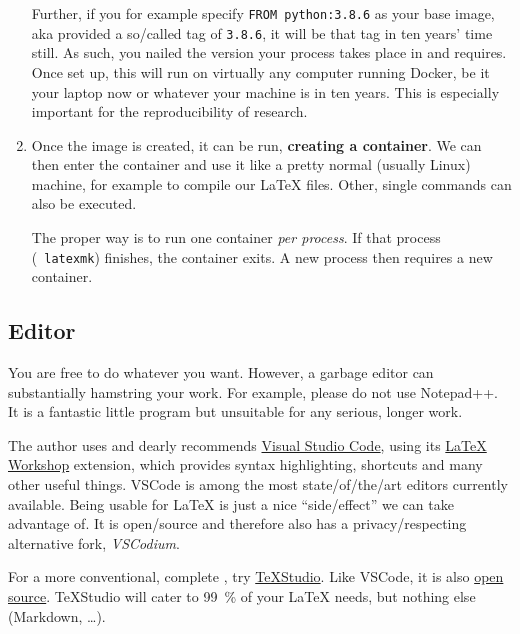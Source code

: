 \begin{enumerate}
        Further, if you for example specify \texttt{FROM python:3.8.6}
        as your base image, aka provided a so\-/called tag of \texttt{3.8.6}, it will be that tag in ten years' time still.
        As such, you nailed the version your process takes place in and requires.
        Once set up, this will run on virtually any computer running Docker, be it your
        laptop now or whatever your machine is in ten years.
        This is especially important for the reproducibility of research.
    \item Once the image is created, it can be run, \textbf{creating a container}.
        We can then enter the container and use it like a pretty normal (usually Linux)
        machine, for example to compile our \LaTeX{} files.
        Other, single commands can also be executed.

        The proper way is to run one container \emph{per process}.
        If that process (\ \texttt{latexmk}) finishes, the container exits.
        A new process then requires a new container.
\end{enumerate}

\subsection{Editor}
\label{ch:editor}

You are free to do whatever you want.
However, a garbage editor can substantially hamstring your work.
For example, please do not use Notepad++.
It is a fantastic little program but unsuitable for any serious, longer work.

The author uses and dearly recommends \href{https://code.visualstudio.com/}{Visual Studio Code},
using its
\href{https://marketplace.visualstudio.com/items?itemName=James-Yu.latex-workshop}{\LaTeX{} Workshop} extension, which provides syntax highlighting, shortcuts and many other useful things.
VSCode is among the most state\-/of\-/the\-/art editors currently available.
Being usable for \LaTeX{} is just a nice \enquote{side\-/effect} we can take
advantage of.
It is open\-/source and therefore also has a privacy\-/respecting alternative fork, \emph{VSCodium}.

For a more conventional, complete ,
try \href{https://www.texstudio.org/}{TeXStudio}.
Like VSCode, it is also
\href{https://github.com/texstudio-org/texstudio}{open source}.
TeXStudio will cater to \SI{99}{\percent} of your \LaTeX{} needs, but nothing else (Markdown, \dots{}).
